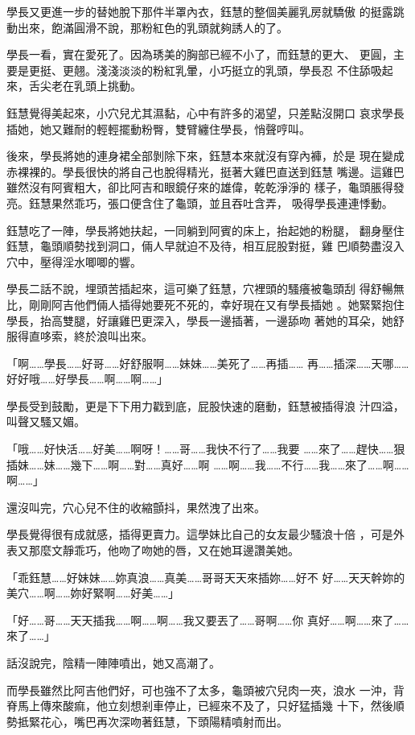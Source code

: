 學長又更進一步的替她脫下那件半罩內衣，鈺慧的整個美麗乳房就驕傲
的挺露跳動出來，飽滿圓滑不說，那粉紅色的乳頭就夠誘人的了。

學長一看，實在愛死了。因為琇美的胸部已經不小了，而鈺慧的更大、
更圓，主要是更挺、更翹。淺淺淡淡的粉紅乳暈，小巧挺立的乳頭，學長忍
不住舔吸起來，舌尖老在乳頭上挑動。

鈺慧覺得美起來，小穴兒尤其濕黏，心中有許多的渴望，只差點沒開口
哀求學長插她，她又難耐的輕輕擺動粉臀，雙臂纏住學長，悄聲哼叫。

後來，學長將她的連身裙全部剝除下來，鈺慧本來就沒有穿內褲，於是
現在變成赤裸裸的。學長很快的將自己也脫得精光，挺著大雞巴直送到鈺慧
嘴邊。這雞巴雖然沒有阿賓粗大，卻比阿吉和眼鏡仔來的雄偉，乾乾淨淨的
樣子，龜頭脹得發亮。鈺慧果然乖巧，張口便含住了龜頭，並且吞吐含弄，
吸得學長連連悸動。

鈺慧吃了一陣，學長將她扶起，一同躺到阿賓的床上，抬起她的粉腿，
翻身壓住鈺慧，龜頭順勢找到洞口，倆人早就迫不及待，相互屁股對挺，雞
巴順勢盡沒入穴中，壓得淫水唧唧的響。

學長二話不說，埋頭苦插起來，這可樂了鈺慧，穴裡頭的騷癢被龜頭刮
得舒暢無比，剛剛阿吉他們倆人插得她要死不死的，幸好現在又有學長插她
。她緊緊抱住學長，抬高雙腿，好讓雞巴更深入，學長一邊插著，一邊舔吻
著她的耳朵，她舒服得直哆索，終於浪叫出來。

「啊……學長……好哥……好舒服啊……妹妹……美死了……再插……
再……插深……天哪……好好哦……好學長……啊……啊……」

學長受到鼓勵，更是下下用力戳到底，屁股快速的磨動，鈺慧被插得浪
汁四溢，叫聲又騷又媚。

「哦……好快活……好美……啊呀！……哥……我快不行了……我要
……來了……趕快……狠插妹……妹……幾下……啊……對……真好……啊
……啊……我……不行……我……來了……啊……啊……」

還沒叫完，穴心兒不住的收縮顫抖，果然洩了出來。

學長覺得很有成就感，插得更賣力。這學妹比自己的女友最少騷浪十倍
，可是外表又那麼文靜乖巧，他吻了吻她的唇，又在她耳邊讚美她。

「乖鈺慧……好妹妹……妳真浪……真美……哥哥天天來插妳……好不
好……天天幹妳的美穴……啊……妳好緊啊……好美……」

「好……哥……天天插我……啊……啊……我又要丟了……哥啊……你
真好……啊……來了……來了……」

話沒說完，陰精一陣陣噴出，她又高潮了。

而學長雖然比阿吉他們好，可也強不了太多，龜頭被穴兒肉一夾，浪水
一沖，背脊馬上傳來酸痲，他立刻想剎車停止，已經來不及了，只好猛插幾
十下，然後順勢抵緊花心，嘴巴再次深吻著鈺慧，下頭陽精噴射而出。

